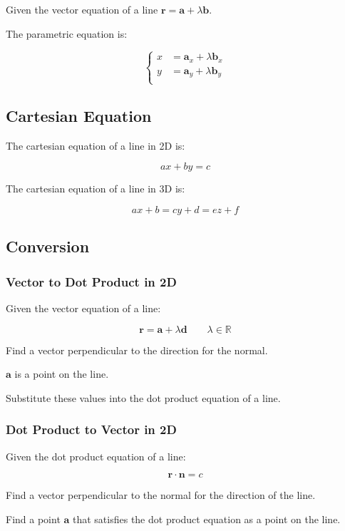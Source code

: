 \documentclass[a4paper,11pt]{report}
\newcommand{\bb}{\boldsymbol}
\begin{document}
Given the vector equation of a line $\bb{r} = \bb{a} + \lambda \bb{b}$.

The parametric equation is:

$$
\begin{cases}
x & = \bb{a}_x + \lambda \bb{b}_x \\
y & = \bb{a}_y + \lambda \bb{b}_y \\
\end{cases}
$$

\subsection{Cartesian Equation}

The cartesian equation of a line in 2D is:

$$
ax + by = c
$$

The cartesian equation of a line in 3D is:

$$
ax + b = cy + d = ez + f
$$

\subsection{Conversion}

\subsubsection{Vector to Dot Product in 2D}

Given the vector equation of a line:

$$
\bb{r} = \bb{a} + \lambda \bb{d} \qquad \lambda \in \mathbb{R}
$$

Find a vector perpendicular to the direction for the normal.

$\bb{a}$ is a point on the line.

Substitute these values into the dot product equation of a line.

\subsubsection{Dot Product to Vector in 2D}

Given the dot product equation of a line:

$$
\bb{r} \cdot \bb{n} = c
$$

Find a vector perpendicular to the normal for the direction of the line.

Find a point $\bb{a}$ that satisfies the dot product equation as a point on the
line.
\end{document}

